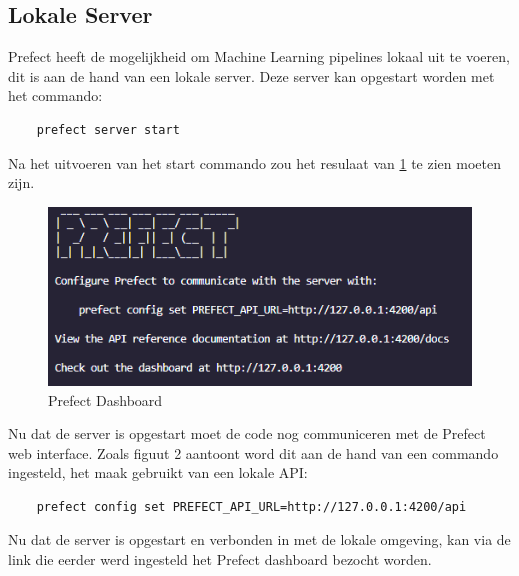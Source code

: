 \subsection{Lokale Server}
Prefect heeft de mogelijkheid om Machine Learning pipelines lokaal uit te voeren, dit is aan de hand van een lokale server. 
Deze server kan opgestart worden met het commando: 
\begin{verbatim}
    prefect server start
\end{verbatim}
Na het uitvoeren van het start commando zou het resulaat van \ref{fig:Prefect_server} te zien moeten zijn.
\begin{figure}[]
    \includegraphics[width=\linewidth]{graphics/Prefect_server.PNG}
    \caption{Prefect Dashboard}
    \label{fig:Prefect_server}
\end{figure}
Nu dat de server is opgestart moet de code nog communiceren met de Prefect web interface. 
Zoals figuut 2 aantoont word dit aan de hand van een commando ingesteld, het maak gebruikt van een lokale API:
\begin{verbatim}
    prefect config set PREFECT_API_URL=http://127.0.0.1:4200/api
\end{verbatim}
Nu dat de server is opgestart en verbonden in met de lokale omgeving, kan via de link die eerder werd ingesteld het Prefect dashboard bezocht worden.
